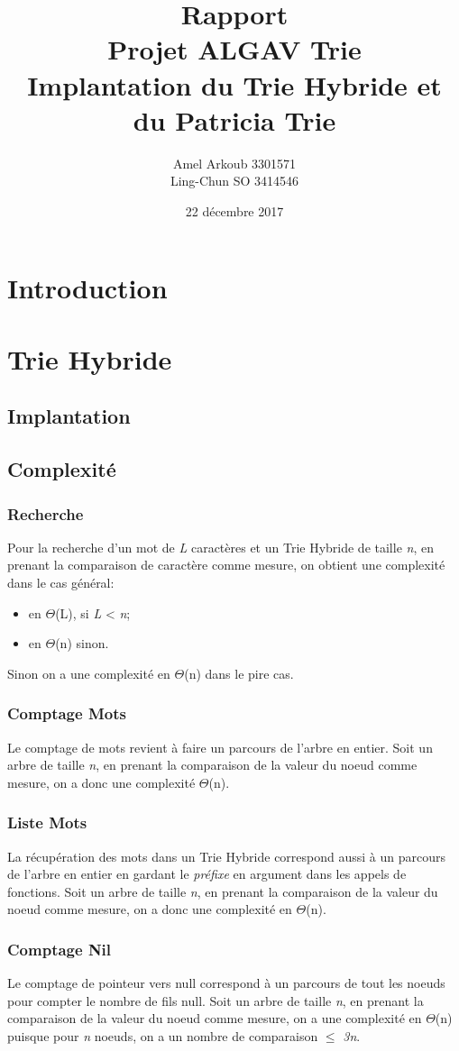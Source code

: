 \documentclass[a4paper,12pt]{report}
\title{\Huge Rapport \\ Projet ALGAV Trie \\ \large Implantation du Trie Hybride et du Patricia Trie}
\author{Amel Arkoub 3301571 \\ Ling-Chun SO 3414546}
\date{22 décembre 2017}
\begin{document}
\maketitle

\tableofcontents
\newpage
\chapter{Introduction}
\chapter{Trie Hybride}
\section{Implantation}
\section{Complexité}
\subsection{Recherche}
Pour la recherche d'un mot de \textit{L} caractères et un Trie Hybride de taille \textit{n}, 
en prenant la comparaison de caractère comme mesure, on obtient une complexité dans le cas général:
\begin{itemize}
 \item en $\Theta$(L), si \textit{L} < \textit{n};
 \item en $\Theta$(n) sinon.
\end{itemize}
Sinon on a une complexité en $\Theta$(n) dans le pire cas.
\subsection{Comptage Mots}
Le comptage de mots revient à faire un parcours de l'arbre en entier.
Soit un arbre de taille \textit{n}, en prenant la comparaison de la valeur du noeud comme mesure,
on a donc une complexité $\Theta$(n).
\subsection{Liste Mots}
La récupération des mots dans un Trie Hybride correspond aussi à un parcours de l'arbre en entier en gardant le \textit{préfixe}
en argument dans les appels de fonctions.
Soit un arbre de taille \textit{n}, en prenant la comparaison de la valeur du noeud comme mesure,
on a donc une complexité en $\Theta$(n).
\subsection{Comptage Nil}
Le comptage de pointeur vers null correspond à un parcours de tout les noeuds pour compter le nombre de fils null.
Soit un arbre de taille \textit{n}, en prenant la comparaison de la valeur du noeud comme mesure,
on a une complexité en $\Theta$(n) puisque pour \textit{n} noeuds, on a un nombre de comparaison $\le$ \textit{3n}.
\end{document}
